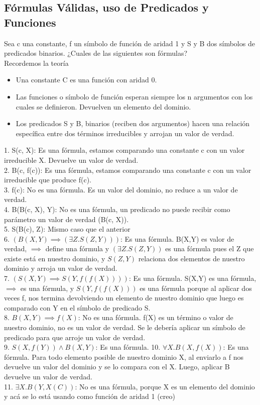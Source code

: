 \documentclass[10pt,a4paper]{article}
\begin{document}
\subsection*{Fórmulas Válidas, uso de Predicados y Funciones}
\label{subsec:lpo_formulas}
Sea c una constante, f un símbolo de función de aridad 1 y S y B dos símbolos de predicados binarios. ¿Cuales de las siguientes son fórmulas? \\
Recordemos la teoría 
\begin{itemize}
    \item Una constante C es una función con aridad 0.
    \item Las funciones o símbolo de función esperan siempre los n argumentos con los cuales se definieron. Devuelven un elemento del dominio.
    \item Los predicados S y B, binarios (reciben dos argumentos) hacen una relación específica entre dos términos irreducibles y arrojan un valor de verdad.
\end{itemize}
1. S(c, X): Es una fórmula, estamos comparando una constante c con un valor irreducible X. Devuelve un valor de verdad. \\
2. B(c, f(c)): Es una fórmula, estamos comparando una constante c con un valor irreducible que produce f(c). \\
3. f(c): No es una fórmula. Es un valor del dominio, no reduce a un valor de verdad. \\
4. B(B(c, X), Y): No es una fórmula, un predicado no puede recibir como parámetro un valor de verdad (B(c, X)). \\
5. S(B(c), Z): Mismo caso que el anterior \\
6. $(B(X,Y) \implies (\exists Z.S(Z,Y)))$: Es una fórmula. B(X,Y) es valor de verdad, $\implies$ define una fórmula y $(\exists Z.S(Z,Y))$ es una fórmula pues el Z que existe está en nuestro dominio, y $S(Z,Y)$ relaciona dos elementos de nuestro dominio y arroja un valor de verdad. \\
7. $(S(X,Y) \implies S(Y, f(f(X))))$: Es una fórmula. S(X,Y) es una fórmula, $\implies$ es una fórmula, y $S(Y, f(f(X)))$ es una fórmula porque al aplicar dos veces f, nos termina devolviendo un elemento de nuestro dominio que luego es comparado con Y en el símbolo de predicado S. \\
8. $B(X,Y) \implies f(X)$: No es una fórmula. f(X) es un término o valor de nuestro dominio, no es un valor de verdad. Se le debería aplicar un símbolo de predicado para que arroje un valor de verdad. \\
9. $S(X, f(Y)) \land B(X,Y)$: Es una fórmula. 
10. $\forall X. B(X, f(X))$: Es una fórmula. Para todo elemento posible de nuestro dominio X, al enviarlo a f nos devuelve un valor del dominio y se lo compara con el X. Luego, aplicar B devuelve un valor de verdad. \\
11. $\exists X. B(Y, X(C))$: No es una fórmula, porque X es un elemento del dominio y acá se lo está usando como función de aridad 1 (creo)
\end{document}

